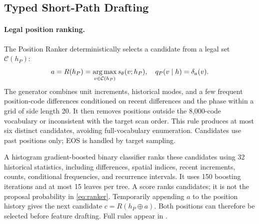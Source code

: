 \subsection{Typed Short-Path Drafting}
\paragraph{Legal position ranking.}
The Position Ranker deterministically selects a candidate from a legal set $\mathcal C(h_P)$:
\begin{equation}
 a=R(h_P)=\operatorname*{arg\,max}_{v\in\mathcal C(h_P)}s_\theta(v;h_P),\quad
 q_P(v\mid h)=\delta_a(v).
\label{eq:ranker}
\end{equation}
The generator combines unit increments, historical modes, and a few frequent position-code differences conditioned on recent differences and the phase within a grid of side length 20. It then removes positions outside the 8,000-code vocabulary or inconsistent with the target scan order. This rule produces at most six distinct candidates, avoiding full-vocabulary enumeration. Candidates use past positions only; EOS is handled by target sampling.

A histogram gradient-boosted binary classifier ranks these candidates using 32 historical statistics, including differences, spatial indices, recent increments, counts, conditional frequencies, and recurrence intervals. It uses 150 boosting iterations and at most 15 leaves per tree. A score ranks candidates; it is not the proposal probability in \cref{eq:ranker}. Temporarily appending $a$ to the position history gives the next candidate $c=R(h_P\oplus a)$. Both positions can therefore be selected before feature drafting. Full rules appear in .

